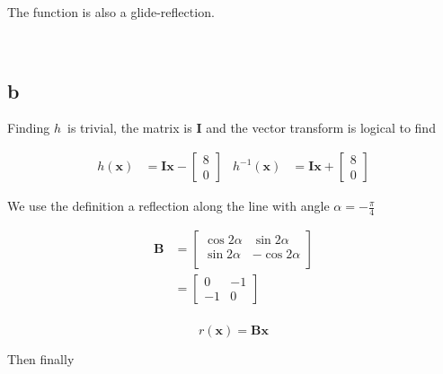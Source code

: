 \documentclass{article}
\newcommand{\blankpage}{
    \newpage
    \
    \newpage
}
\begin{document}
The function is also a glide-reflection.

\blankpage
\subsection{b}

Finding $h$ is trivial, the matrix is $\mathbf I$ and the vector transform is logical to find

\begin{align*}
    h(\mathbf x)      &= \mathbf {Ix} - \begin{bmatrix} 8 \\ 0\end{bmatrix} &
    h^{-1}(\mathbf x) &= \mathbf {Ix} + \begin{bmatrix} 8 \\ 0\end{bmatrix}
\end{align*}

We use the definition a reflection along the line with angle $\alpha = -\frac\pi4$

\begin{align*}
    \mathbf B
    &= \begin{bmatrix}
        \cos 2\alpha & \sin 2 \alpha \\
        \sin 2\alpha & -\cos 2 \alpha \\
       \end{bmatrix} \\
    &= \begin{bmatrix}
        0 & -1\\
        -1 & 0
       \end{bmatrix} \\
\end{align*}

$$r(\mathbf x) = \mathbf {Bx}$$

Then finally
\end{document}
